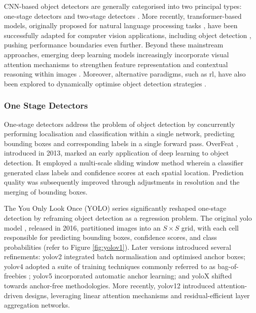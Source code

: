 CNN-based object detectors are generally categorised into two principal types: one-stage detectors and two-stage detectors \cite{one_two_stage_detection}. More recently, transformer-based models, originally proposed for natural language processing tasks \cite{transformers}, have been successfully adapted for computer vision applications, including object detection \cite{detr, rt-detr}, pushing performance boundaries even further. Beyond these mainstream approaches, emerging deep learning models increasingly incorporate visual attention mechanisms to strengthen feature representation and contextual reasoning within images \cite{bartolo2024correlationobjectdetectionperformance, va_detection}. Moreover, alternative paradigms, such as \gls{rl}, have also been explored to dynamically optimise object detection strategies \cite{bartolo2024integratingsaliencyrankingreinforcement, Caicedo_2015_ICCV}.


\subsubsection{One Stage Detectors}
\label{subsubsec:2_onestage}

One-stage detectors address the problem of object detection by concurrently performing localisation and classification within a single network, predicting bounding boxes and corresponding labels in a single forward pass.
OverFeat \cite{overfeat}, introduced in 2013, marked an early application of deep learning to object detection. It employed a multi-scale sliding window method wherein a classifier generated class labels and confidence scores at each spatial location. Prediction quality was subsequently improved through adjustments in resolution and the merging of bounding boxes.

The You Only Look Once (YOLO) series significantly reshaped one-stage detection by reframing object detection as a regression problem. The original \gls{yolo} model \cite{yolo}, released in 2016, partitioned images into an $S \times S$ grid, with each cell responsible for predicting bounding boxes, confidence scores, and class probabilities (refer to Figure \ref{fig:yolov1}). Later versions introduced several refinements: \gls{yolo}v2 \cite{yolov2} integrated batch normalisation and optimised anchor boxes; \gls{yolo}v4 \cite{yolov4} adopted a suite of training techniques commonly referred to as bag-of-freebies \cite{bagoffreebies}; \gls{yolo}v5 \cite{yolov5} incorporated automatic anchor learning; and \gls{yolo}X \cite{yolox} shifted towards anchor-free methodologies. More recently, \gls{yolo}v12 \cite{yolov12} introduced attention-driven designs, leveraging linear attention mechanisms and residual-efficient layer aggregation networks.

